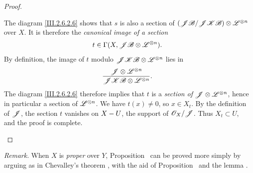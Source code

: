 \begin{proof}
\begin{env}[2.6.2.5]
The diagram \eqref{III.2.6.2.6} shows that $s$ is also a section of $(\mathscr{J}\mathscr{B}/\mathscr{J}\mathscr{K}\mathscr{B})
\otimes\mathscr{L}^{\otimes n}$
over $X$.
It is therefore the \emph{canonical image of a section}
\[
  t\in\Gamma(X,\mathscr{J}\mathscr{B}\otimes\mathscr{L}^{\otimes n}).
\]
By definition, the image of $t$ modulo
$\mathscr{J}\mathscr{K}\mathscr{B}\otimes\mathscr{L}^{\otimes n}$ lies in
\[
  \frac{\mathscr{J}\otimes\mathscr{L}^{\otimes n}}
       {\mathscr{J}\mathscr{K}\mathscr{B}\otimes\mathscr{L}^{\otimes n}}.
\]
The diagram \eqref{III.2.6.2.6} therefore implies that $t$ is a \emph{section
of} $\mathscr{J}\otimes\mathscr{L}^{\otimes n}$, hence in particular a section of
$\mathscr{L}^{\otimes n}$.
We have $t(x)\neq0$, so $x\in X_t$.
By the definition of $\mathscr{J}$, the section $t$ vanishes on $X- U$, the
support of $\mathscr{O}_X/\mathscr{J}$.
Thus $X_t\subset U$, and the proof is complete.
\end{env}
\end{proof}


\begin{env}[2.6.3]
\label{III.2.6.3}
\emph{Remark.}
When $X$ is \emph{proper} over $Y$, Proposition~ can be proved
more simply by arguing as in Chevalley's theorem
, with the aid of Proposition~ and
the lemma .
\end{env}
